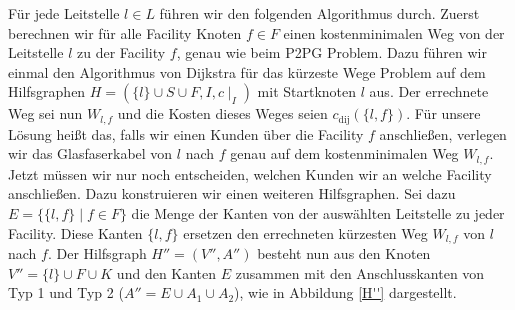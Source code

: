 \documentclass[11pt,a4paper]{article}
\theoremstyle{my_th_style1}
\begin{document}
Für jede Leitstelle $l \in L$ führen wir den folgenden Algorithmus durch.
Zuerst berechnen wir für alle Facility Knoten $f \in F$ einen kostenminimalen Weg von der Leitstelle $l$ zu der Facility $f$, genau wie beim P2PG Problem. Dazu führen wir einmal den Algorithmus von Dijkstra für das kürzeste Wege Problem auf dem Hilfsgraphen $H=(\{l\} \cup S \cup F , I,c\mid_I)$ mit Startknoten $l$ aus. Der errechnete Weg sei nun $W_{l,f}$ und die Kosten dieses Weges seien $c_{\text{dij}}(\{l,f\})$.
Für unsere Lösung heißt das, falls wir einen Kunden über die Facility $f$ anschließen, verlegen wir das Glasfaserkabel von $l$ nach $f$ genau auf dem kostenminimalen Weg $W_{l,f}$.  Jetzt müssen wir nur noch entscheiden, welchen Kunden wir an welche Facility anschließen.
Dazu konstruieren wir einen weiteren Hilfsgraphen. Sei dazu $E=\{\{l,f  \} \mid f \in F  \}$ die Menge der Kanten von der auswählten Leitstelle zu jeder Facility. Diese Kanten $\{l,f\}$ ersetzen den errechneten kürzesten Weg $W_{l,f}$ von $l$ nach $f$. Der Hilfsgraph $H''=(V'',A'')$ besteht nun aus den Knoten $V''=\{l\} \cup F \cup K$ und den Kanten $E$ zusammen mit den Anschlusskanten von Typ 1 und Typ 2 ($A''=E \cup A_1 \cup A_2$), wie in Abbildung \ref{H''} dargestellt.
\end{document}
